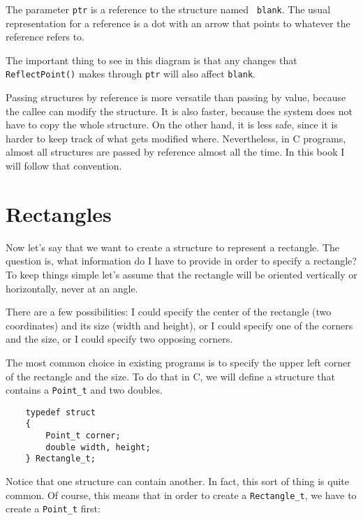 \vspace{0.1in}
\centerline{}
\vspace{0.1in}
%
The parameter {\tt ptr} is a reference to the structure named {\tt
	blank}.  The usual representation for a reference is a dot with an
arrow that points to whatever the reference refers to.

The important thing to see in this diagram is that any changes that
{\tt ReflectPoint()} makes through {\tt ptr} will also affect {\tt blank}.

Passing structures by reference is more versatile than passing by
value, because the callee can modify the structure.  It is also
faster, because the system does not have to copy the whole
structure.  On the other hand, it is less safe, since it is harder to
keep track of what gets modified where.  Nevertheless, in C
programs, almost all structures are passed by reference almost all the
time.  In this book I will follow that convention.


\section{Rectangles}

Now let's say that we want to create a structure to represent
a rectangle.  The question is, what information do I have to
provide in order to specify a rectangle?  To keep things simple
let's assume that the rectangle will be oriented vertically or
horizontally, never at an angle.

There are a few possibilities: I could specify the center of
the rectangle (two coordinates) and its size (width and height),
or I could specify one of the corners and the size, or I
could specify two opposing corners.

The most common choice in existing programs is to specify the
upper left corner of the rectangle and the size.  To do that
in C, we will define a structure that contains a {\tt Point\_t}
and two doubles.

\begin{verbatim}
	typedef struct 
	{
		Point_t corner;
		double width, height;
	} Rectangle_t;  
\end{verbatim}
%
Notice that one structure can contain another.  In fact, this
sort of thing is quite common.  Of course, this means that in
order to create a {\tt Rectangle\_t}, we have to create a {\tt Point\_t}
first:

